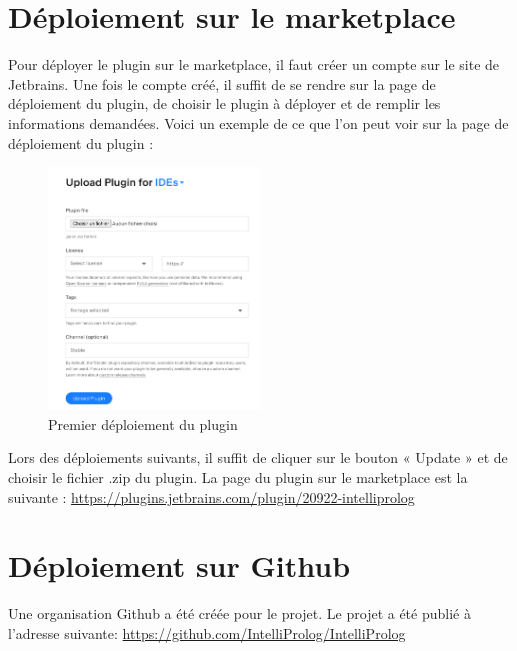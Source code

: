 \section{Déploiement sur le marketplace}
\noindent Pour déployer le plugin sur le marketplace, il faut créer un compte sur le site de Jetbrains.
Une fois le compte créé, il suffit de se rendre sur la page de déploiement du plugin, de choisir le plugin à déployer et de remplir les informations demandées.
\newdoubleline Voici un exemple de ce que l'on peut voir sur la page de déploiement du plugin :

\begin{figure}[H]
    \centering
    \includegraphics[width=0.5\textwidth]{images/first_deploy.png}
    \caption{Premier déploiement du plugin}
    \label{fig:first_deploy}
\end{figure}

\noindent Lors des déploiements suivants, il suffit de cliquer sur le bouton « Update » et de choisir le fichier .zip du plugin.
\newdoubleline La page du plugin sur le marketplace est la suivante : \url{https://plugins.jetbrains.com/plugin/20922-intelliprolog}

\section{Déploiement sur Github}
\noindent Une organisation Github a été créée pour le projet.
Le projet a été publié à l'adresse suivante: \url{https://github.com/IntelliProlog/IntelliProlog}


